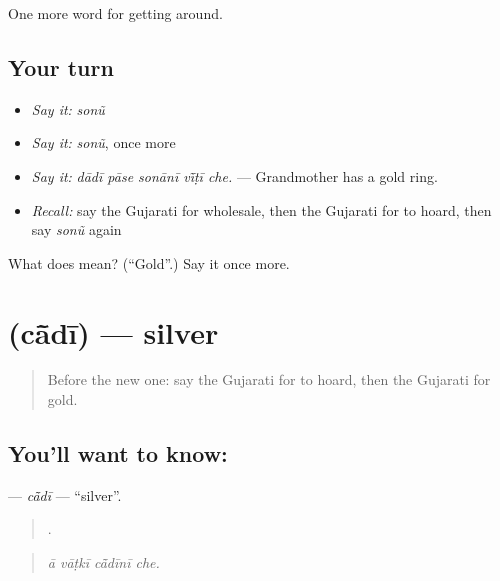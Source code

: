 \begin{grammarlens}[title={What you've built}]
One more word for getting around.
\end{grammarlens}

\subsection*{Your turn}
\begin{itemize}
\raggedright
  \item \emph{Say it:} \emph{sonũ}
  \item \emph{Say it:} \emph{sonũ}, once more
  \item \emph{Say it:} \emph{dādī pāse sonānī vī̃ṭī che.} — Grandmother has a gold ring.
  \item \emph{Recall:} say the Gujarati for wholesale, then the Gujarati for to hoard, then say \emph{sonũ} again
\end{itemize}

\begin{tcolorbox}[breakable,colback=teal!4,colframe=teal!35!black,title={Before you move on}]
What does  mean? (\textquotedblleft{}Gold\textquotedblright{}.) Say it once more.
\end{tcolorbox}
\section[\texorpdfstring{\gu{ચાંદી} (cā̃dī)}{ચાંદી (cā̃dī)}]{ (cā̃dī) — silver}

\label{lesson:GU-C432-cadi}



\begin{quote}
Before the new one: say the Gujarati for to hoard, then the Gujarati for gold.
\end{quote}

\subsection*{You'll want to know: }
\textbf{} — \emph{cā̃dī} — \textquotedblleft{}silver\textquotedblright{}.

\begin{quote}
   .
\end{quote}

\begin{quote}
\emph{ā vāṭkī cā̃dīnī che.}
\end{quote}

